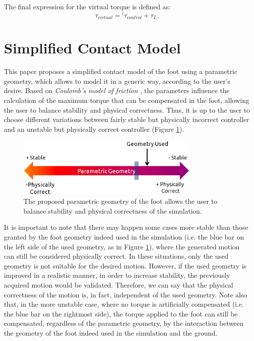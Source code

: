 \documentclass[tog]{acmsiggraph}
\begin{document}
The final expression for the virtual torque is defined as:
%
\begin{equation}
  \tau_{virtual} =  {^{l}\tau_{control}} + \tau_{L}.
\end{equation}

\section{Simplified Contact Model}

This paper proposes a simplified contact model of the foot using a parametric geometry, which allows to model it in a generic way, according to the user's desire.
Based on \textit{Coulomb’s model of friction} \cite{bib:Popov10}, the parameters influence the calculation of the maximum torque that can be compensated in the foot,
allowing the user to balance stability and physical correctness.
Thus, it is up to the user to choose different variations between fairly stable but physically incorrect controller and an unstable
but physically correct controller (Figure \ref{fig:EstabVsCorrFis}).

\begin{figure}[htbp]
\includegraphics[width=9cm]{images/geometriaparametrica-translate.eps}
\caption{The proposed parametric geometry of the foot allows the user to
         balance stability and physical correctness of the simulation.}
\label{fig:EstabVsCorrFis}
\end{figure}

It is important to note that there may happen some cases more stable than those granted by the foot geometry indeed used in the simulation (i.e. the blue bar on the left side of the used geometry, as in Figure \ref{fig:EstabVsCorrFis}), where the generated motion can still be considered physically correct. In these situations, only the used geometry is not suitable for the desired motion.
However, if the used geometry is improved in a realistic manner, in order to increase stability, the previously acquired motion would be validated.
Therefore, we can say that the physical correctness of the motion is, in fact, independent of the used geometry.
%
Note also that, in the more unstable case, where no torque is artificially compensated (i.e. the blue bar on the rightmost side), the torque applied to the foot can still be compensated, regardless of the parametric geometry, by the interaction between the geometry of the foot indeed used in the simulation and the ground.
\end{document}
